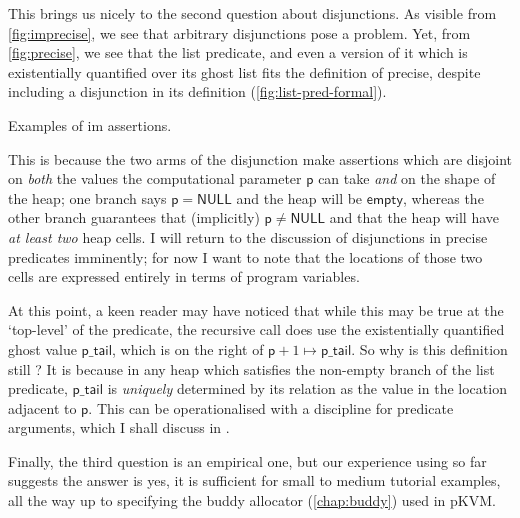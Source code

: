 This brings us nicely to the second question about disjunctions. As visible
from \cref{fig:imprecise}, we see that arbitrary disjunctions pose a problem.
Yet, from \cref{fig:precise}, we see that the list predicate, and even a
version of it which is existentially quantified over its ghost list fits the
definition of precise, despite including a disjunction in its definition
(\cref{fig:list-pred-formal}).

\begin{marginfigure}
\caption{Examples of im assertions.}\label{fig:imprecise}
\end{marginfigure}

This is because the two arms of the disjunction make assertions
which are disjoint on \emph{both} the values the computational parameter
$\mathsf{p}$ can take \emph{and} on the shape of the heap; one branch says
$\mathsf{p} = \mathsf{NULL}$ and the heap will be $\mathsf{empty}$, whereas the
other branch guarantees that (implicitly) $\mathsf{p} \neq \mathsf{NULL}$ and
that the heap will have \emph{at least two} heap cells. I will return to the
discussion of disjunctions in precise predicates imminently; for now I want to
note that the locations of those two cells are expressed entirely in terms of
program variables.

At this point, a keen reader may have noticed that while this may be true at
the `top-level' of the predicate, the recursive call does use the existentially
quantified ghost value $\mathsf{p\_tail}$, which is on the right of $\mathsf{p}
+ 1 \mapsto{} \mathsf{p\_tail}$. So why is this definition still ?
It is because in any heap which satisfies the non-empty branch of the list
predicate, $\mathsf{p\_tail}$ is \emph{uniquely} determined by its relation as
the value in the location adjacent to $\mathsf{p}$. This can be operationalised with a 
discipline for predicate arguments, which I shall discuss in
.

Finally, the third question is an empirical one, but our experience using
 so far~ suggests the answer is
yes, it is sufficient for small to medium tutorial examples, all the way up to
specifying the buddy allocator (\cref{chap:buddy}) used in pKVM\@.

